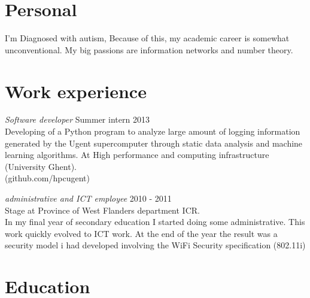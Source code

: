 \documentclass[margin, 10pt]{res} %
\begin{document}
\begin{resume}

 
\section{Personal}
I'm Diagnosed with autism, Because of this, my academic career is somewhat unconventional. My big passions are information networks and number theory.
\section{Work experience}
{\sl Software developer} \hfill Summer intern 2013 \\
Developing of a Python program to analyze large amount of logging information generated by the Ugent supercomputer through static data analysis and machine learning algorithms.
At High performance and computing infrastructure (University Ghent).\\ (github.com/hpcugent)

{\sl administrative and ICT employee} \hfill 2010 - 2011 \\
Stage at Province of West Flanders department ICR. \\
In my final year of secondary education I started doing some administrative. This work quickly evolved to ICT work. At the end of the year the result was a security model i had developed involving the WiFi Security specification (802.11i)

\section{Education}


\end{resume}
\end{document}
